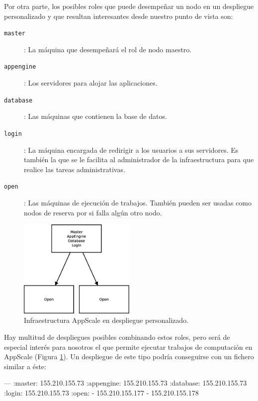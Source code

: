 Por otra parte, los posibles roles que puede desempeñar un nodo en un despliegue personalizado y que resultan interesantes desde nuestro punto de vista son:

\begin{description}
\item[\texttt{master}]: La máquina que desempeñará el rol de nodo maestro.
\item[\texttt{appengine}]: Los servidores para alojar las aplicaciones.
\item[\texttt{database}]: Las máquinas que contienen la base de datos.
\item[\texttt{login}]: La máquina encargada de redirigir a los usuarios a sus servidores. Es también la que se le facilita al administrador de la infraestructura para que realice las tareas administrativas.
\item[\texttt{open}]: Las máquinas de ejecución de trabajos. También pueden ser usadas como nodos de reserva por si falla algún otro nodo.
\end{description}

\begin{figure} [!htbp]
  \centering
  \includegraphics[width=0.5\textwidth]{figuras/Arquitectura_AppScale.eps}
  \caption{Infraestructura AppScale en despliegue personalizado.}
\label{figure:arquitectura-appscale}
\end{figure}

Hay multitud de despliegues posibles combinando estos roles, pero será de especial interés para nosotros el que permite ejecutar trabajos de computación en AppScale (Figura \ref{figure:arquitectura-appscale}). Un despliegue de este tipo podría conseguirse con un fichero similar a éste:

\begin{yamlcode}
---
:master:    155.210.155.73
:appengine: 155.210.155.73
:database:  155.210.155.73
:login:     155.210.155.73
:open:
- 155.210.155.177
- 155.210.155.178
\end{yamlcode}


